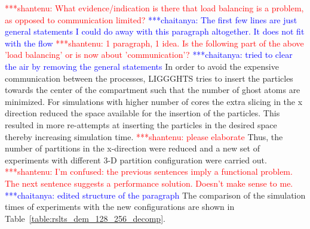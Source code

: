 \documentclass[preprint,11pt,authoryear]{elsarticle}
\newcommand{\jhanote}[1]{ {\textcolor{red} { ***shantenu: #1 }}}
\newcommand{\csnote}[1]{ {\textcolor{blue} { ***chaitanya: #1 }}}
\newcommand{\jhanote}[1]{}
\newcommand{\csnote}[1]{}
\begin{document}
\jhanote{What evidence/indication is there that load balancing is
a problem, as opposed to communication limited?} \csnote{The first few lines 
are  just general statements I could do away with this paragraph altogether. 
It does not fit with the flow} %
\jhanote{1 paragraph, 1 idea. Is the following part of the above 'load balancing' or is 
now about 'communication'?} \csnote{tried to clear the air by removing the general statements}
In order to avoid the expensive communication
between the processes, LIGGGHTS tries to insert the particles towards the
center of the compartment such that the number of ghost atoms are minimized.
For simulations with higher number of cores the extra slicing in the x direction 
reduced the space available for the insertion of the particles.
This resulted in more re-attempts at inserting the particles in the desired space 
thereby increasing simulation time.
\jhanote{please elaborate} 
Thus, the number of partitions in the x-direction were reduced and a new set of 
experiments with different 3-D partition configuration were carried out. 
\jhanote{I'm
confused: the previous sentences imply a functional problem. The next sentence
suggests a performance solution. Doesn't make sense to me.} \csnote{edited structure of the paragraph}
The comparison of the simulation times of experiments with the new configurations are shown in
Table~\ref{table:rslts_dem_128_256_decomp}.
\end{document}
